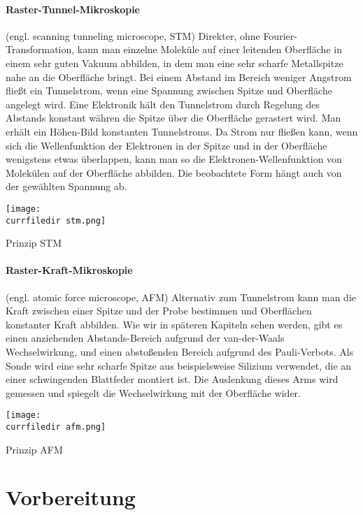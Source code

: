 \paragraph{Raster-Tunnel-Mikroskopie} (engl. scanning tunneling microscope, STM) Direkter, ohne Fourier-Transformation, kann man einzelne Moleküle auf einer leitenden Oberfläche in einem sehr guten Vakuum abbilden, in dem man eine sehr scharfe Metallspitze nahe an die Oberfläche bringt. Bei einem Abstand im Bereich weniger Angstrom fließt ein Tunnelstrom, wenn eine Spannung zwischen Spitze und Oberfläche angelegt wird. Eine Elektronik hält den Tunnelstrom durch Regelung des Abstands konstant währen die Spitze über die Oberfläche gerastert wird. Man erhält ein Höhen-Bild konstanten Tunnelstroms. Da Strom nur fließen kann, wenn sich die Wellenfunktion der Elektronen in der Spitze und in der Oberfläche wenigstens etwas überlappen, kann man so die Elektronen-Wellenfunktion von Molekülen auf der Oberfläche abbilden. Die beobachtete Form hängt auch von der gewählten Spannung ab.

\begin{marginfigure}
\texttt{[image: \\currfiledir stm.png]}
\caption{Prinzip STM}
\end{marginfigure}


\paragraph{Raster-Kraft-Mikroskopie} (engl. atomic force microscope, AFM) Alternativ zum Tunnelstrom kann man die Kraft zwischen einer Spitze und der Probe bestimmen und Oberflächen konstanter Kraft abbilden. Wie wir in späteren Kapiteln sehen werden, gibt es einen anziehenden Abstands-Bereich aufgrund der van-der-Waals Wechselwirkung, und einen abstoßenden Bereich aufgrund des Pauli-Verbots. Als Sonde wird eine sehr scharfe Spitze aus beispielsweise Silizium verwendet, die an einer schwingenden Blattfeder montiert ist. Die Auslenkung dieses Arms wird gemessen und spiegelt die Wechselwirkung mit der Oberfläche wider.


\begin{marginfigure}
\texttt{[image: \\currfiledir afm.png]}
\caption{Prinzip AFM}
\end{marginfigure}

 
\section{Vorbereitung}


